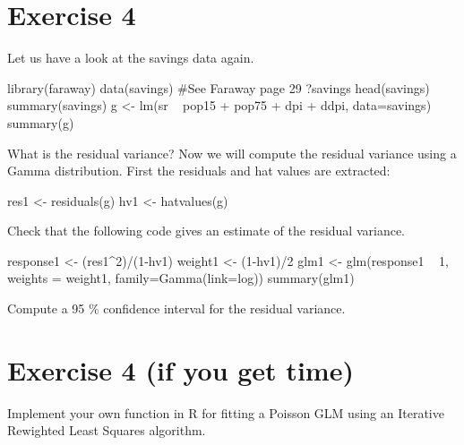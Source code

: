 \documentclass[10pt,a4paper,english]{report}
\begin{document}
\section*{Exercise 4}
Let us have a look at the savings data again.
\begin{Schunk}
\begin{Sinput}
library(faraway)
data(savings) #See Faraway page 29
?savings
head(savings)
summary(savings)
g <- lm(sr ~ pop15 + pop75 + dpi + ddpi, data=savings)
summary(g)
\end{Sinput}
\end{Schunk}
What is the residual variance? \newline
Now we will compute the residual variance using a Gamma distribution. First the residuals and hat values are extracted:
\begin{Schunk}
\begin{Sinput}
res1 <- residuals(g)
hv1 <- hatvalues(g)
\end{Sinput}
\end{Schunk}
Check that the following code gives an estimate of the residual variance.
\begin{Schunk}
\begin{Sinput}
response1 <- (res1^2)/(1-hv1)
weight1 <- (1-hv1)/2
glm1 <- glm(response1 ~ 1, weights = weight1, family=Gamma(link=log))
summary(glm1)
\end{Sinput}
\end{Schunk}
Compute a 95 \% confidence interval for the residual variance.

\section*{Exercise 4 (if you get time)}
Implement your own function in R for fitting a Poisson GLM using an Iterative Rewighted Least Squares algorithm.
\end{document}
